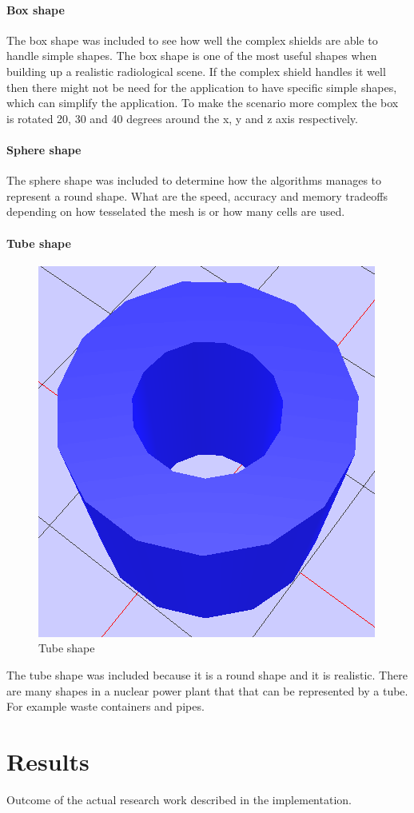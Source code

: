 \documentclass[11pt,twoside,a4paper]{report}
\begin{document}
\subsubsection{Box shape}
The box shape was included to see how well the complex shields are able to handle simple shapes. The box shape is one of the most useful shapes when building up a realistic radiological scene. If the complex shield handles it well then there might not be need for the application to have specific simple shapes, which can simplify the application. To make the scenario more complex the box is rotated 20, 30 and 40 degrees around the x, y and z axis respectively.

\subsubsection{Sphere shape}
The sphere shape was included to determine how the algorithms manages to represent a round shape. What are the speed, accuracy and memory tradeoffs depending on how tesselated the mesh is or how many cells are used. 

\subsubsection{Tube shape}
\begin{figure}[h]
    \centering
    \includegraphics[width=0.45\linewidth]{images/tube_mesh}
    \caption{Tube shape}
    \label{fig:Tube shape}
\end{figure}

The tube shape was included because it is a round shape and it is realistic. There are many shapes in a nuclear power plant that that can be represented by a tube. For example waste containers and pipes.

\chapter{Results}
Outcome of the actual research work described in the implementation.
\end{document}
